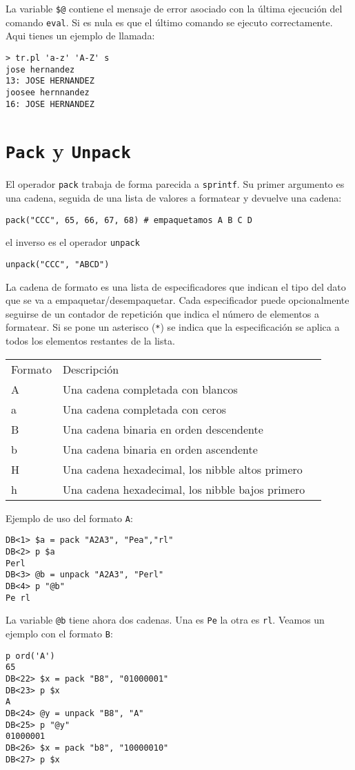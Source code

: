 La variable \verb|$@| contiene el mensaje de error asociado con la
última ejecución del comando \verb|eval|. Si es nula es que el último comando
se ejecuto correctamente.
Aqui tienes un ejemplo de llamada:

\begin{verbatim}
> tr.pl 'a-z' 'A-Z' s
jose hernandez
13: JOSE HERNANDEZ
joosee hernnandez
16: JOSE HERNANDEZ 
\end{verbatim}

\section{{\tt Pack} y {\tt Unpack}}
\label{section:pack}
El operador \verb|pack| trabaja de forma parecida a \verb|sprintf|.
Su primer argumento es una cadena, seguida de una lista de valores
a formatear y devuelve una cadena:
\begin{verbatim}
pack("CCC", 65, 66, 67, 68) # empaquetamos A B C D
\end{verbatim}
el inverso es el operador \verb|unpack|
\begin{verbatim}
unpack("CCC", "ABCD")
\end{verbatim}
La cadena de formato es una lista de especificadores que indican el
tipo del dato que se va a empaquetar/desempaquetar. Cada especificador
puede opcionalmente seguirse de un contador de repetición
que indica el número de elementos a formatear. Si se pone un
asterisco (\verb|*|) se indica que la especificación
se aplica a todos los elementos restantes de la lista.

\begin{tabular}{|l|l|l}
Formato  & Descripción \\
A & Una cadena completada con blancos\\
a & Una cadena completada con ceros\\
B & Una cadena binaria en orden descendente\\
b & Una cadena binaria en orden ascendente\\
H & Una cadena hexadecimal, los nibble altos primero\\
h & Una cadena hexadecimal, los nibble bajos primero\\
\end{tabular}

Ejemplo de uso del formato \verb|A|:
\begin{verbatim}
DB<1> $a = pack "A2A3", "Pea","rl"
DB<2> p $a
Perl
DB<3> @b = unpack "A2A3", "Perl"
DB<4> p "@b"
Pe rl
\end{verbatim}
La variable \verb|@b| tiene ahora dos cadenas. Una es \verb|Pe| la otra es \verb|rl|.
Veamos un ejemplo con el formato \verb|B|:
\begin{verbatim}
p ord('A')
65
DB<22> $x = pack "B8", "01000001"
DB<23> p $x
A
DB<24> @y = unpack "B8", "A"
DB<25> p "@y"
01000001
DB<26> $x = pack "b8", "10000010"
DB<27> p $x
\end{verbatim}

